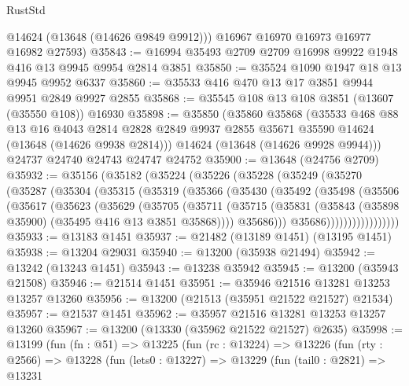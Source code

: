 \begin{lexlean}{RustStd}
\begin{coremodule}
        @14624
        (@13648 (@14626 @9849 @9912)))
      @16967
      @16970
      @16973
      @16977
      @16982
      @27593)
@35843 := @16994 @35493 @2709 @2709 @16998 @9922 @1948 @416 @13 @9945 @9954 @2814 @3851
@35850 := @35524 @1090 @1947 @18 @13 @9945 @9952 @6337
@35860 := @35533 @416 @470 @13 @17 @3851 @9944 @9951 @2849 @9927 @2855
@35868 := @35545 @108 @13 @108 @3851 (@13607 (@35550 @108)) @16930
@35898 := @35850
    (@35860
      @35868
      (@35533
        @468
        @88
        @13
        @16
        @4043
        @2814
        @2828
        @2849
        @9937
        @2855
        @35671
        @35590
        @14624
        (@13648 (@14626 @9938 @2814)))
      @14624
      (@13648 (@14626 @9928 @9944)))
    @24737
    @24740
    @24743
    @24747
    @24752
@35900 := @13648 (@24756 @2709)
@35932 := @35156
    (@35182
      (@35224
        (@35226
          (@35228
            (@35249
              (@35270
                (@35287
                  (@35304
                    (@35315
                      (@35319
                        (@35366
                          (@35430
                            (@35492
                              (@35498
                                (@35506
                                  (@35617
                                    (@35623
                                      (@35629
                                        (@35705
                                          (@35711
                                            (@35715
                                              (@35831
                                                (@35843
                                                  (@35898 @35900)
                                                  (@35495 @416 @13 @3851 @35868))))
                                            @35686)))
                                      @35686)))))))))))))))))
@35933 := @13183 @1451
@35937 := @21482 (@13189 @1451) (@13195 @1451)
@35938 := @13204 @29031
@35940 := @13200 (@35938 @21494)
@35942 := @13242 (@13243 @1451)
@35943 := @13238 @35942
@35945 := @13200 (@35943 @21508)
@35946 := @21514 @1451
@35951 := @35946 @21516 @13281 @13253 @13257 @13260
@35956 := @13200 (@21513 (@35951 @21522 @21527) @21534)
@35957 := @21537 @1451
@35962 := @35957 @21516 @13281 @13253 @13257 @13260
@35967 := @13200 (@13330 (@35962 @21522 @21527) @2635)
@35998 := @13199
    (fun (fn : @51) =>
    @13225
      (fun (rc : @13224) =>
      @13226
        (fun (rty : @2566) =>
        @13228
          (fun (lets0 : @13227) =>
          @13229
            (fun (tail0 : @2821) =>
            @13231

\end{coremodule}
\end{lexlean}

